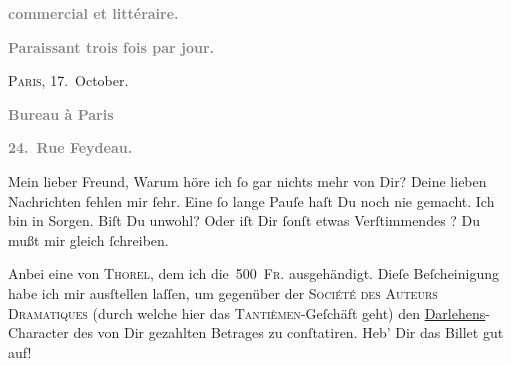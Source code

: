 \pstart
           \begin{otherlanguage}{french}\textcolor{gray}{\textbf{commercial et littéraire.}}\end{otherlanguage}\pend
           
\pstart
           \begin{otherlanguage}{french}\textcolor{gray}{\textbf{\textbf{Paraissant trois fois par jour.}}}\end{otherlanguage}\hfill \textsc{Paris}, 17. October.\pend
           
\pstart
           \begin{otherlanguage}{french}\textcolor{gray}{\textbf{\textbf{Bureau à Paris}}}\end{otherlanguage}\pend
           
\pstart
           \begin{otherlanguage}{french}\textcolor{gray}{\textbf{\textbf{24. Rue Feydeau.}}}\end{otherlanguage}\pend
           
\pstart\center{}Mein lieber Freund,\pend\vspace{0.5em}
\pstart
           Warum höre ich{ }ſo gar nichts mehr von Dir? Deine lieben Nachrichten fehlen mir{ }ſehr.
               Eine{ }ſo lange Pauſe haſt Du noch nie gemacht. Ich bin in Sorgen. Biſt Du unwohl? Oder
               iſt Dir{ }ſonſt etwas Verſtimmendes \label{K_L02787-1v}\label{K_L02787-1}? Du mußt mir gleich{ }ſchreiben.\pend
           
\pstart
           Anbei eine \label{K_L02787-2v}\label{K_L02787-2} von \textsc{Thorel}, dem ich die 500 \textsc{Fr.} ausgehändigt. Dieſe
               Beſcheinigung habe ich mir ausſtellen laſſen, um gegenüber der \textsc{Société des Auteurs Dramatiques} (durch welche hier das \textsc{Tantièmen}-Geſchäft geht) {\pb}den \uline{Darlehens}-Character des von Dir gezahlten Betrages zu conſtatiren. Heb’ Dir das
               Billet gut auf!\pend
           
